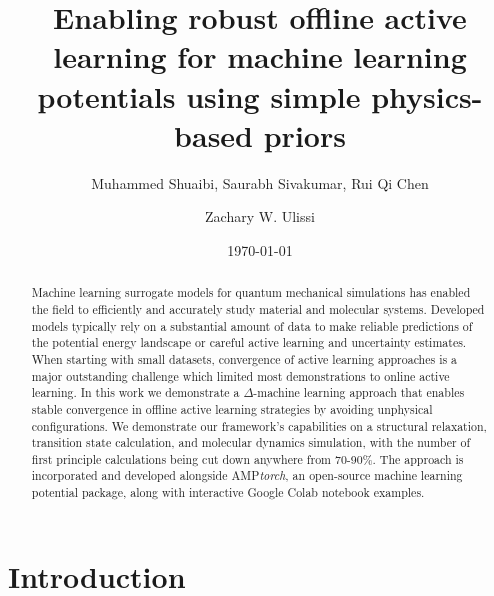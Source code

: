 \documentclass[%
 reprint,
 amsmath,amssymb,
 aps,
]{revtex4-2}
\begin{document}
\title{Enabling robust offline active learning for machine learning potentials using simple physics-based priors}

\author{Muhammed Shuaibi, Saurabh Sivakumar, Rui Qi Chen}
\author{Zachary W. Ulissi}%
%

\date{\today}

\begin{abstract}
Machine learning surrogate models for quantum mechanical simulations has enabled the field to efficiently and accurately study material and molecular systems. Developed models typically rely on a substantial amount of data to make reliable predictions of the potential energy landscape or careful active learning and uncertainty estimates. When starting with small datasets, convergence of active learning approaches is a major outstanding challenge which limited most demonstrations to online active learning. In this work we demonstrate a $\Delta$-machine learning approach that enables stable convergence in offline active learning strategies by avoiding unphysical configurations.  We demonstrate our framework's capabilities on a structural relaxation, transition state calculation, and molecular dynamics simulation,  with the number of first principle calculations being cut down anywhere from 70-90\%.  The approach is incorporated and developed alongside AMP\textit{torch}, an open-source machine learning potential package, along with interactive Google Colab notebook examples.  
\end{abstract}

\maketitle

\section{Introduction}
\end{document}
